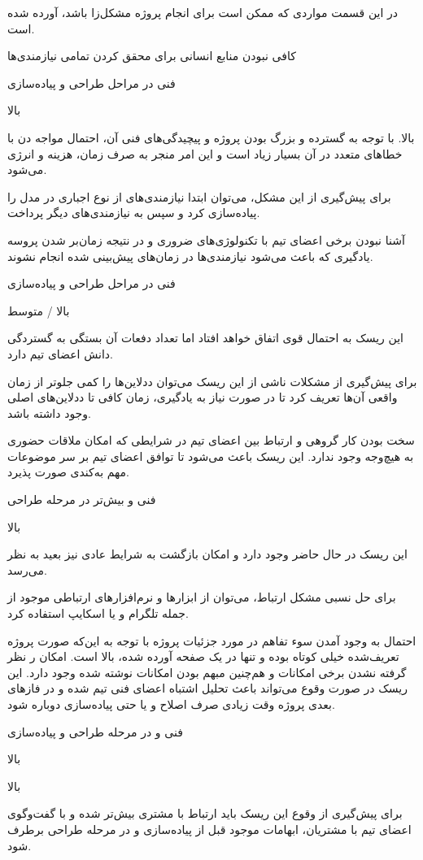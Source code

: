 
 در این قسمت مواردی که ممکن است برای انجام پروژه مشکل‌زا باشد، آورده شده است.

 کافی نبودن منابع انسانی برای محقق کردن تمامی نیازمندی‌ها

 فنی در مراحل طراحی و پیاده‌سازی


 بالا

 بالا. با توجه به گسترده و بزرگ بودن پروژه و پیچیدگی‌های فنی آن، احتمال مواجه دن با خطاهای متعدد در آن بسیار زیاد است و این امر منجر به صرف زمان، هزینه و انرژی می‌شود.

 برای پیش‌گیری از این مشکل، می‌توان ابتدا نیازمندی‌های از نوع اجباری در مدل  را پیاده‌سازی کرد و سپس به نیازمندی‌های دیگر پرداخت.

\newpage

 آشنا نبودن برخی اعضای تیم با تکنولوژی‌های ضروری و در نتیجه زمان‌بر شدن پروسه یادگیری که باعث می‌شود نیازمندی‌ها در زمان‌های پیش‌بینی شده انجام نشوند.

 فنی در مراحل طراحی و پیاده‌سازی

 بالا / متوسط

 این ریسک به احتمال قوی اتفاق خواهد افتاد اما تعداد دفعات آن بستگی به گستردگی دانش اعضای تیم دارد.

 برای پیش‌گیری از مشکلات ناشی از این ریسک می‌توان ددلاین‌ها را کمی جلوتر از زمان واقعی آن‌ها تعریف کرد تا در صورت نیاز به یادگیری، زمان کافی تا ددلاین‌های اصلی وجود داشته باشد.

\newpage

 سخت بودن کار گروهی و ارتباط بین اعضای تیم در شرایطی که امکان ملاقات حضوری به هیچ‌وجه وجود ندارد. این ریسک باعث می‌شود تا توافق اعضای تیم بر سر موضوعات مهم به‌کندی صورت پذیرد.

 فنی و بیش‌تر در مرحله طراحی

 بالا

 این ریسک در حال حاضر وجود دارد و امکان بازگشت به شرایط عادی نیز بعید به نظر می‌رسد.

 برای حل نسبی مشکل ارتباط، می‌توان از ابزارها و نرم‌افزارهای ارتباطی موجود از جمله تلگرام و یا اسکایپ استفاده کرد.

\newpage


 احتمال به وجود آمدن سوء تفاهم در مورد جزئیات پروژه با توجه به این‌که صورت پروژه تعریف‌شده خیلی کوتاه بوده و تنها در یک صفحه آورده شده، بالا است. امکان ر نظر گرفته نشدن برخی امکانات و هم‌چنین مبهم بودن امکانات نوشته شده وجود دارد. این ریسک در صورت وقوع می‌تواند باعث تحلیل اشتباه اعضای فنی تیم شده و در فازهای بعدی پروژه وقت زیادی صرف اصلاح و یا حتی پیاده‌سازی دوباره شود.

 فنی و در مرحله طراحی و پیاده‌سازی

 بالا

 بالا

  برای پیش‌گیری از وقوع این ریسک باید ارتباط با مشتری بیش‌تر شده و با گفت‌وگوی اعضای تیم با مشتریان، ابهامات موجود قبل از پیاده‌سازی و در مرحله طراحی برطرف شود.

